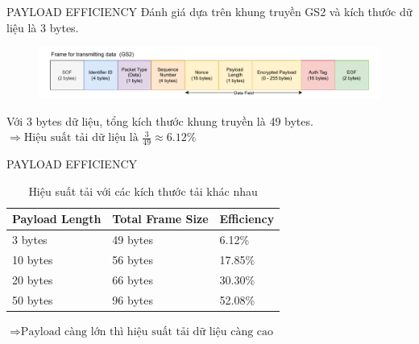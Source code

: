\begin{frame}{PAYLOAD EFFICIENCY}
	Đánh giá dựa trên khung truyền GS2 và kích thước dữ liệu là 3 bytes.
	\begin{figure}
		\centering
		\includegraphics[width=1\textwidth]{pic/gs2.pdf}
	\end{figure}
	Với 3 bytes dữ liệu, tổng kích thước khung truyền là 49 bytes.
	$\Rightarrow \text{Hiệu suất tải dữ liệu là } \frac{3}{49} \approx 6.12\%$
\end{frame}

\begin{frame}{PAYLOAD EFFICIENCY}
	\begin{table}[h]
	\centering
	\small
	\caption{Hiệu suất tải với các kích thước tải khác nhau}
	\label{tab:efficiency}
	\begin{tabular}{|p{4cm}|p{5cm}|p{3cm}|}
	\hline
	Payload Length & Total Frame Size & Efficiency \\
	\hline
	3 bytes   & 49 bytes  & 6.12\%  \\
	10 bytes  & 56 bytes & 17.85\% \\
	20 bytes  & 66 bytes & 30.30\% \\
	50 bytes  & 96 bytes & 52.08\% \\
	\hline
	\end{tabular}
	\end{table}
	$\Rightarrow \text{Payload càng lớn thì hiệu suất tải dữ liệu càng cao}$
\end{frame}